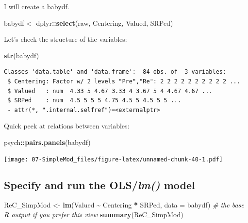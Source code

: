 \documentclass[
  11pt,
]{book}
\newenvironment{Shaded}{\begin{snugshade}}{\end{snugshade}}
\newcommand{\AttributeTok}[1]{\textcolor[rgb]{0.27,0.27,0.27}{#1}}
\newcommand{\CommentTok}[1]{\textcolor[rgb]{0.37,0.37,0.37}{\textit{#1}}}
\newcommand{\FunctionTok}[1]{\textcolor[rgb]{0.27,0.27,0.27}{\textbf{#1}}}
\newcommand{\NormalTok}[1]{#1}
\newcommand{\OtherTok}[1]{\textcolor[rgb]{0.37,0.37,0.37}{#1}}
\newcommand{\SpecialCharTok}[1]{\textcolor[rgb]{0.43,0.43,0.43}{\textbf{#1}}}
\begin{document}
I will create a babydf.

\begin{Shaded}
\begin{Highlighting}[]
\NormalTok{babydf }\OtherTok{\textless{}{-}}\NormalTok{ dplyr}\SpecialCharTok{::}\FunctionTok{select}\NormalTok{(raw, Centering, Valued, SRPed)}
\end{Highlighting}
\end{Shaded}

Let's check the structure of the variables:

\begin{Shaded}
\begin{Highlighting}[]
\FunctionTok{str}\NormalTok{(babydf)}
\end{Highlighting}
\end{Shaded}

\begin{verbatim}
Classes 'data.table' and 'data.frame':  84 obs. of  3 variables:
 $ Centering: Factor w/ 2 levels "Pre","Re": 2 2 2 2 2 2 2 2 2 2 ...
 $ Valued   : num  4.33 5 4.67 3.33 4 3.67 5 4 4.67 4.67 ...
 $ SRPed    : num  4.5 5 5 5 4.75 4.5 5 4.5 5 5 ...
 - attr(*, ".internal.selfref")=<externalptr> 
\end{verbatim}

Quick peek at relations between variables:

\begin{Shaded}
\begin{Highlighting}[]
\NormalTok{psych}\SpecialCharTok{::}\FunctionTok{pairs.panels}\NormalTok{(babydf)}
\end{Highlighting}
\end{Shaded}

\texttt{[image: 07-SimpleMod\_files/figure-latex/unnamed-chunk-40-1.pdf]}

\hypertarget{specify-and-run-the-olslm-model}{%
\subsection*{\texorpdfstring{Specify and run the OLS/\emph{lm()} model}{Specify and run the OLS/lm() model}}\label{specify-and-run-the-olslm-model}}


\begin{Shaded}
\begin{Highlighting}[]
\NormalTok{ReC\_SimpMod }\OtherTok{\textless{}{-}} \FunctionTok{lm}\NormalTok{(Valued }\SpecialCharTok{\textasciitilde{}}\NormalTok{ Centering }\SpecialCharTok{*}\NormalTok{ SRPed, }\AttributeTok{data =}\NormalTok{ babydf)}
\CommentTok{\# the base R output if you prefer this view}
\FunctionTok{summary}\NormalTok{(ReC\_SimpMod)}
\end{Highlighting}
\end{Shaded}
\end{document}
